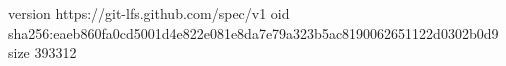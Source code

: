 version https://git-lfs.github.com/spec/v1
oid sha256:eaeb860fa0cd5001d4e822e081e8da7e79a323b5ac8190062651122d0302b0d9
size 393312

